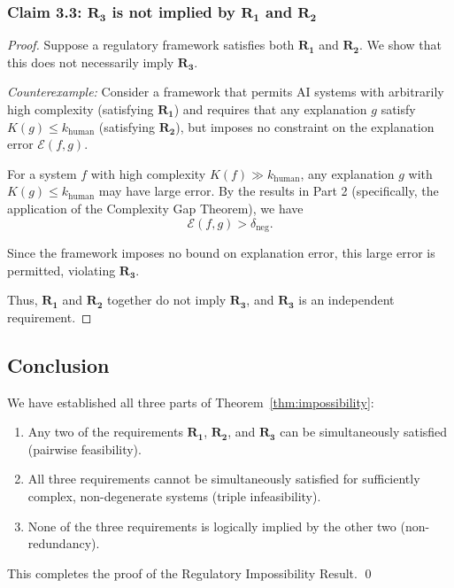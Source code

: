 \documentclass[11pt,letter,leqno]{article}
\begin{document}
\subsubsection*{Claim 3.3: $\mathbf{R_3}$ is not implied by $\mathbf{R_1}$ and $\mathbf{R_2}$}

\begin{proof}
Suppose a regulatory framework satisfies both $\mathbf{R_1}$ and $\mathbf{R_2}$. We show 
that this does not necessarily imply $\mathbf{R_3}$.

\textit{Counterexample:} Consider a framework that permits AI systems with 
arbitrarily high complexity (satisfying $\mathbf{R_1}$) and requires that any 
explanation $g$ satisfy $K(g) \leq k_{\text{human}}$ (satisfying $\mathbf{R_2}$), 
but imposes no constraint on the explanation error $\mathcal{E}(f,g)$.

For a system $f$ with high complexity $K(f) \gg k_{\text{human}}$, any explanation 
$g$ with $K(g) \leq k_{\text{human}}$ may have large error. By the results in 
Part 2 (specifically, the application of the Complexity Gap Theorem), we have
\[
\mathcal{E}(f,g) > \delta_{\text{neg}}.
\]

Since the framework imposes no bound on explanation error, this large error is 
permitted, violating $\mathbf{R_3}$.

Thus, $\mathbf{R_1}$ and $\mathbf{R_2}$ together do not imply $\mathbf{R_3}$, and 
$\mathbf{R_3}$ is an independent requirement.
\end{proof}

\subsection*{Conclusion}

We have established all three parts of Theorem~\ref{thm:impossibility}:

\begin{enumerate}
\item Any two of the requirements $\mathbf{R_1}$, $\mathbf{R_2}$, and $\mathbf{R_3}$ can 
be simultaneously satisfied (pairwise feasibility).
\item All three requirements cannot be simultaneously satisfied for sufficiently 
complex, non-degenerate systems (triple infeasibility).
\item None of the three requirements is logically implied by the other two 
(non-redundancy).
\end{enumerate}

This completes the proof of the Regulatory Impossibility Result. \qed
\end{document}

